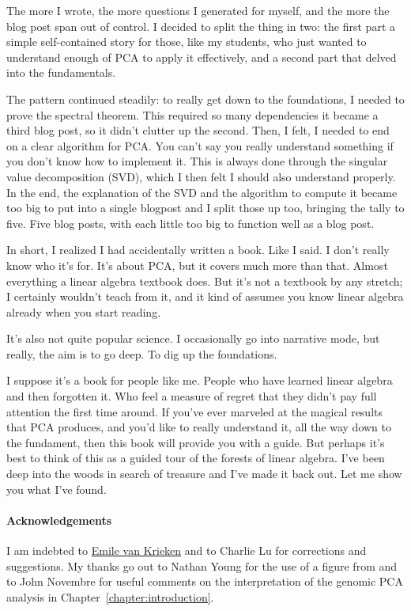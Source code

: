 \documentclass{pca}
\theoremstyle{theorem}
\theoremstyle{proof}
\begin{document}
The more I wrote, the more questions I generated for myself, and the more the blog post span out of control. I decided to split the thing in two: the first part a simple self-contained story for those, like my students, who just wanted to understand enough of PCA to apply it effectively, and a second part that delved into the fundamentals. 

The pattern continued steadily: to really get down to the foundations, I needed to prove the spectral theorem. This required so many dependencies it became a third blog post, so it didn't clutter up the second. Then, I felt, I needed to end on a clear algorithm for PCA. You can't say you really understand something if you don't know how to implement it. This is always done through the singular value decomposition (SVD), which I then felt I should also understand properly. In the end, the explanation of the SVD and the algorithm to compute it became too big to put into a single blogpost and I split those up too, bringing the tally to five. Five blog posts, with each little too big to function well as a blog post.

In short, I realized I had accidentally written a book. Like I said. I don't really know who it's for. It's about PCA, but it covers much more than that. Almost everything a linear algebra textbook does. But it's not a textbook by any stretch; I certainly wouldn't teach from it, and it kind of assumes you know linear algebra already when you start reading.

It's also not quite popular science. I occasionally go into narrative mode, but really, the aim is to go deep. To dig up the foundations.

 I suppose it's a book for people like me. People who have learned linear algebra and then forgotten it. Who feel a measure of regret that they didn't pay full attention the first time around. If you've ever marveled at the magical results that PCA produces, and you'd like to really understand it, all the way down to the fundament, then this book will provide you with a guide. But perhaps it's best to think of this as a guided tour of the forests of linear algebra. I've been deep into the woods in search of treasure and I've made it back out. Let me show you what I've found.
 
\enlargethispage{2em}
 
\paragraph{Acknowledgements} I am indebted to \href{https://emilevankrieken.com/}{Emile van Krieken} and to Charlie Lu for corrections and suggestions. My thanks go out to Nathan Young for the use of a figure from \citep{young2015fossil} and to John Novembre for useful comments on the interpretation of the genomic PCA analysis in Chapter~\ref{chapter:introduction}.
\end{document}
